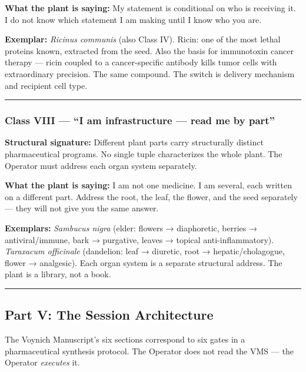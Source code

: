 \textbf{What the plant is saying:} My statement is conditional on who is
receiving it. I do not know which statement I am making until I know who
you are.

\textbf{Exemplar:} \emph{Ricinus communis} (also Class IV). Ricin: one
of the most lethal proteins known, extracted from the seed. Also the
basis for immunotoxin cancer therapy --- ricin coupled to a
cancer-specific antibody kills tumor cells with extraordinary precision.
The same compound. The switch is delivery mechanism and recipient cell
type.

\begin{center}\rule{0.5\linewidth}{0.5pt}\end{center}

\hypertarget{class-viii-i-am-infrastructure-read-me-by-part}{%
\subsubsection{Class VIII --- ``I am infrastructure --- read me by
part''}\label{class-viii-i-am-infrastructure-read-me-by-part}}

\textbf{Structural signature:} Different plant parts carry structurally
distinct pharmaceutical programs. No single tuple characterizes the
whole plant. The Operator must address each organ system separately.

\textbf{What the plant is saying:} I am not one medicine. I am several,
each written on a different part. Address the root, the leaf, the
flower, and the seed separately --- they will not give you the same
answer.

\textbf{Exemplars:} \emph{Sambucus nigra} (elder: flowers → diaphoretic,
berries → antiviral/immune, bark → purgative, leaves → topical
anti-inflammatory). \emph{Taraxacum officinale} (dandelion: leaf →
diuretic, root → hepatic/cholagogue, flower → analgesic). Each organ
system is a separate structural address. The plant is a library, not a
book.

\begin{center}\rule{0.5\linewidth}{0.5pt}\end{center}

\hypertarget{part-v-the-session-architecture}{%
\subsection{Part V: The Session
Architecture}\label{part-v-the-session-architecture}}

The Voynich Manuscript's six sections correspond to six gates in a
pharmaceutical synthesis protocol. The Operator does not read the VMS
--- the Operator \emph{executes} it.

